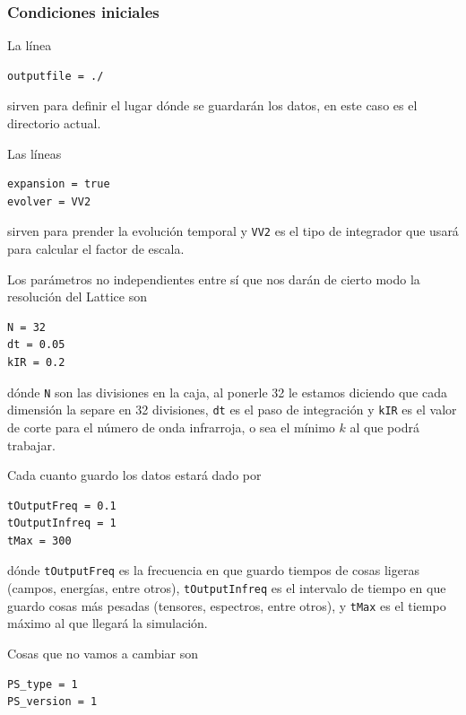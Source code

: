 \subsubsection{Condiciones iniciales}

La línea

\begin{lstlisting}[style = cppStyle]
outputfile = ./
\end{lstlisting}

\noindent
sirven para definir el lugar dónde se guardarán los datos, en este caso es el directorio actual.

Las líneas

\begin{lstlisting}[style = cppStyle]
expansion = true
evolver = VV2
\end{lstlisting}

\noindent
sirven para prender la evolución temporal y \texttt{VV2} es el tipo de integrador que usará para calcular el factor de escala.

Los parámetros no independientes entre sí que nos darán de cierto modo la resolución del Lattice son

\begin{lstlisting}[style = cppStyle]
N = 32
dt = 0.05
kIR = 0.2
\end{lstlisting}

\noindent
dónde \texttt{N} son las divisiones en la caja, al ponerle 32 le estamos diciendo que cada dimensión la separe en 32 divisiones, \texttt{dt} es el paso de integración y \texttt{kIR} es el valor de corte para el número de onda infrarroja, o sea el mínimo $k$ al que podrá trabajar.

Cada cuanto guardo los datos estará dado por

\begin{lstlisting}[style = cppStyle]
tOutputFreq = 0.1
tOutputInfreq = 1
tMax = 300
\end{lstlisting}

\noindent
dónde \texttt{tOutputFreq} es la frecuencia en que guardo tiempos de cosas ligeras (campos, energías, entre otros), \texttt{tOutputInfreq} es el intervalo de tiempo en que guardo cosas más pesadas (tensores, espectros, entre otros), y \texttt{tMax} es el tiempo máximo al que llegará la simulación.

Cosas que no vamos a cambiar son

\begin{lstlisting}[style = cppStyle]
PS_type = 1
PS_version = 1
\end{lstlisting}

